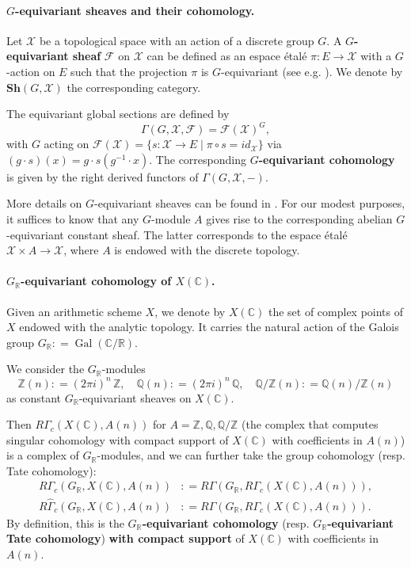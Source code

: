 \documentclass[leqno,12pt]{article}
\theoremstyle{plain}
\theoremstyle{definition}
\DeclareMathOperator{\Gal}{Gal}
\newcommand{\CC}{\mathbb{C}}
\newcommand{\QQ}{\mathbb{Q}}
\newcommand{\RR}{\mathbb{R}}
\newcommand{\ZZ}{\mathbb{Z}}
\newcommand{\dfn}{\mathrel{\mathop:}=}
\begin{document}
\paragraph{$G$-equivariant sheaves and their cohomology.}
Let $\mathcal{X}$ be a topological space with an action of a discrete group $G$.
A \textbf{$G$-equivariant sheaf} $\mathcal{F}$ on $\mathcal{X}$ can be defined
as an espace \'{e}tal\'{e} $\pi\colon E\to \mathcal{X}$ with a $G$-action on $E$
such that the projection $\pi$ is $G$-equivariant (see e.g. \cite[\S II.6 +
pp.\,594]{MacLane-Moerdijk}). We denote by $\mathbf{Sh} (G, \mathcal{X})$ the
corresponding category.

The equivariant global sections are defined by
$$\Gamma (G,\mathcal{X},\mathcal{F}) = \mathcal{F} (\mathcal{X})^G,$$
with $G$ acting on
$\mathcal{F} (\mathcal{X}) = \{ s\colon \mathcal{X}\to E \mid \pi\circ s = id_\mathcal{X} \}$
via $(g\cdot s) (x) = g\cdot s (g^{-1}\cdot x)$. The corresponding
\textbf{$G$-equivariant cohomology} is given by the right derived functors of
$\Gamma (G,\mathcal{X},-)$.

More details on $G$-equivariant sheaves can be found in
\cite[Chapitre~2]{Morin-these}. For our modest purposes, it suffices to know
that any $G$-module $A$ gives rise to the corresponding abelian $G$-equivariant
constant sheaf. The latter corresponds to the espace \'{e}tal\'{e}
$\mathcal{X}\times A \to \mathcal{X}$, where $A$ is endowed with the discrete
topology.

\paragraph{$G_\RR$-equivariant cohomology of $X (\CC)$.}
Given an arithmetic scheme $X$, we denote by $X (\CC)$ the set of complex points
of $X$ endowed with the analytic topology. It carries the natural action of the
Galois group $G_\RR \dfn \Gal (\CC/\RR)$.

We consider the $G_\RR$-modules
\[ \ZZ (n) \dfn (2\pi i)^n\,\ZZ, \quad
  \QQ (n) \dfn (2\pi i)^n\,\QQ, \quad
  \QQ/\ZZ (n) \dfn \QQ (n) / \ZZ (n) \]
as constant $G_\RR$-equivariant sheaves on $X (\CC)$.

Then $R\Gamma_c (X (\CC), A (n))$ for $A = \ZZ, \QQ, \QQ/\ZZ$ (the complex that
computes singular cohomology with compact support of $X (\CC)$ with
coefficients in $A (n)$) is a complex of $G_\RR$-modules, and we can further
take the group cohomology (resp. Tate cohomology):
\begin{align*}
  R\Gamma_c (G_\RR, X (\CC), A (n)) & \dfn R\Gamma (G_\RR, R\Gamma_c (X (\CC), A (n))),\\
  R\widehat{\Gamma}_c (G_\RR, X (\CC), A (n)) & \dfn R\widehat{\Gamma} (G_\RR, R\Gamma_c (X (\CC), A (n))).
\end{align*}
By definition, this is the \textbf{$G_\RR$-equivariant cohomology}
(resp. \textbf{$G_\RR$-equivariant Tate cohomology})
\textbf{with compact support} of $X (\CC)$ with coefficients in $A (n)$.
\end{document}
